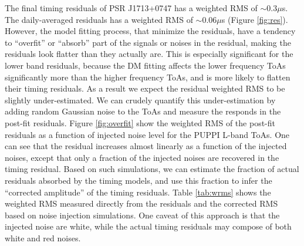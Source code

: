 The final timing residuals of PSR J1713+0747 has a weighted RMS of $\sim 0.3\mu$s. The daily-averaged residuals has a weighted RMS of $\sim 0.06\mu$s (Figure \ref{fig:res}).
However, the model fitting process, that minimize the residuals, have a tendency to ``overfit'' or 
``absorb'' part of the signals or noises in the residual, making the residuals
look flatter than they actually are. 
This is especially significant for the lower band residuals, because
the DM fitting affects the lower frequency ToAs significantly more than the
higher frequency ToAs, and is more likely to flatten their timing residuals. 
As a result we expect the residual weighted RMS to be slightly under-estimated. We can crudely quantify
this under-estimation by adding random Gaussian noise to the ToAs and
measure the responds in the post-fit residuals. Figure \ref{fig:overfit} show
the weighted RMS of the post-fit residuals as a function of injected noise level for the PUPPI L-band ToAs. 
One can see that the residual increases almost linearly as a function of the
injected noises, except that only a fraction of the injected noises are
recovered in the timing residual.
Based on such simulations, we
can estimate the fraction of actual residuals absorbed by the timing models, and use this fraction to infer the ``corrected amplitude'' of the timing residuals. 
Table \ref{tab:wrms} shows the weighted RMS measured directly from the residuals 
and the corrected RMS based on noise injection simulations. One caveat 
of this approach is that the injected noise are white, while the actual timing
residuals may compose of both white and red noises. 


